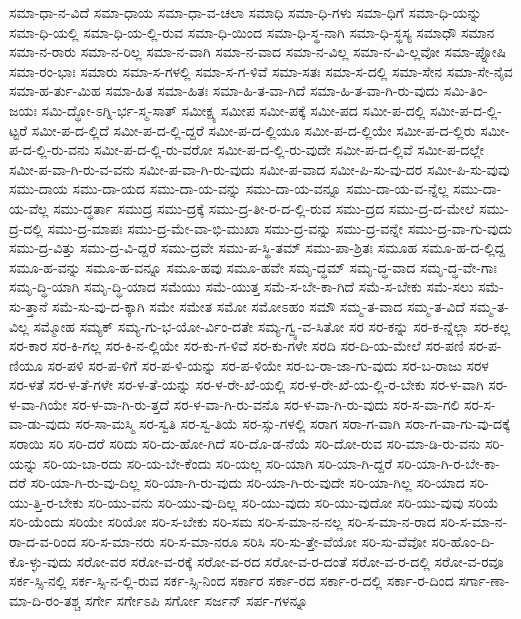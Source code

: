 {ಸಮಾ-ಧಾ-ನ-ವಿದೆ
ಸಮಾ-ಧಾಯ
ಸಮಾ-ಧಾ-ವ-ಚಲಾ
ಸಮಾಧಿ
ಸಮಾ-ಧಿ-ಗಳು
ಸಮಾ-ಧಿಗೆ
ಸಮಾ-ಧಿ-ಯನ್ನು
ಸಮಾ-ಧಿ-ಯಲ್ಲಿ
ಸಮಾ-ಧಿ-ಯ-ಲ್ಲಿ-ರುವ
ಸಮಾ-ಧಿ-ಯಿಂದ
ಸಮಾ-ಧಿ-ಸ್ಥ-ನಾಗಿ
ಸಮಾ-ಧಿ-ಸ್ಥಸ್ಯ
ಸಮಾಧೌ
ಸಮಾನ
ಸಮಾ-ನ-ರಾರು
ಸಮಾ-ನ-ರಿಲ್ಲ
ಸಮಾ-ನ-ವಾಗಿ
ಸಮಾ-ನ-ವಾದ
ಸಮಾ-ನ-ವಿಲ್ಲ
ಸಮಾ-ನ-ವಿ-ಲ್ಲವೋ
ಸಮಾ-ಪ್ನೋಷಿ
ಸಮಾ-ರಂ-ಭಾಃ
ಸಮಾರು
ಸಮಾ-ಸ-ಗಳಲ್ಲಿ
ಸಮಾ-ಸ-ಗ-ಳಿವೆ
ಸಮಾ-ಸತಃ
ಸಮಾ-ಸ-ದಲ್ಲಿ
ಸಮಾ-ಸೇನ
ಸಮಾ-ಸೇ-ನೈವ
ಸಮಾ-ಹ-ರ್ತು-ಮಿಹ
ಸಮಾ-ಹಿತ
ಸಮಾ-ಹಿತಃ
ಸಮಾ-ಹಿ-ತ-ವಾ-ಗಿದೆ
ಸಮಾ-ಹಿ-ತ-ವಾ-ಗಿ-ರು-ವುದು
ಸಮಿ-ತಿಂ-ಜಯಃ
ಸಮಿ-ದ್ಧೋ-ಽಗ್ನಿ-ರ್ಭ-ಸ್ಮ-ಸಾತ್
ಸಮೀಕ್ಷ್ಯ
ಸಮೀಪ
ಸಮೀ-ಪಕ್ಕೆ
ಸಮೀ-ಪದ
ಸಮೀ-ಪ-ದಲ್ಲಿ
ಸಮೀ-ಪ-ದ-ಲ್ಲಿ-ಟ್ಟರೆ
ಸಮೀ-ಪ-ದ-ಲ್ಲಿದೆ
ಸಮೀ-ಪ-ದ-ಲ್ಲಿ-ದ್ದರೆ
ಸಮೀ-ಪ-ದ-ಲ್ಲಿಯೂ
ಸಮೀ-ಪ-ದ-ಲ್ಲಿಯೇ
ಸಮೀ-ಪ-ದ-ಲ್ಲಿರು
ಸಮೀ-ಪ-ದ-ಲ್ಲಿ-ರು-ವನು
ಸಮೀ-ಪ-ದ-ಲ್ಲಿ-ರು-ವರೋ
ಸಮೀ-ಪ-ದ-ಲ್ಲಿ-ರು-ವುದೇ
ಸಮೀ-ಪ-ದ-ಲ್ಲಿವೆ
ಸಮೀ-ಪ-ದಲ್ಲೇ
ಸಮೀ-ಪ-ವಾ-ಗಿ-ರು-ವ-ವನು
ಸಮೀ-ಪ-ವಾ-ಗಿ-ರು-ವುದು
ಸಮೀ-ಪ-ವಾದ
ಸಮೀ-ಪಿ-ಸು-ವು-ದರ
ಸಮೀ-ಪಿ-ಸು-ವುವು
ಸಮು-ದಾಯ
ಸಮು-ದಾ-ಯದ
ಸಮು-ದಾ-ಯ-ವನ್ನು
ಸಮು-ದಾ-ಯ-ವನ್ನೂ
ಸಮು-ದಾ-ಯ-ವ-ನ್ನೆಲ್ಲ
ಸಮು-ದಾ-ಯ-ವೆಲ್ಲ
ಸಮು-ದ್ಧರ್ತಾ
ಸಮುದ್ರ
ಸಮು-ದ್ರಕ್ಕೆ
ಸಮು-ದ್ರ-ತೀ-ರ-ದ-ಲ್ಲಿ-ರುವ
ಸಮು-ದ್ರದ
ಸಮು-ದ್ರ-ದ-ಮೇಲೆ
ಸಮು-ದ್ರ-ದಲ್ಲಿ
ಸಮು-ದ್ರ-ಮಾಪಃ
ಸಮು-ದ್ರ-ಮೇ-ವಾ-ಭಿ-ಮುಖಾ
ಸಮು-ದ್ರ-ವನ್ನು
ಸಮು-ದ್ರ-ವನ್ನೇ
ಸಮು-ದ್ರ-ವಾ-ಗು-ವುದು
ಸಮು-ದ್ರ-ವಿತ್ತು
ಸಮು-ದ್ರ-ವಿ-ದ್ದರೆ
ಸಮು-ದ್ರವೇ
ಸಮು-ಪ-ಸ್ಥಿ-ತಮ್
ಸಮು-ಪಾ-ಶ್ರಿತಃ
ಸಮೂಹ
ಸಮೂ-ಹ-ದ-ಲ್ಲಿದ್ದ
ಸಮೂ-ಹ-ವನ್ನು
ಸಮೂ-ಹ-ವನ್ನೂ
ಸಮೂ-ಹವು
ಸಮೂ-ಹವೇ
ಸಮೃ-ದ್ಧಮ್
ಸಮೃ-ದ್ಧ-ವಾದ
ಸಮೃ-ದ್ಧ-ವೇ-ಗಾಃ
ಸಮೃ-ದ್ಧಿ-ಯಾಗಿ
ಸಮೃ-ದ್ಧಿ-ಯಾದ
ಸಮೆಯು
ಸಮೆ-ಯುತ್ತ
ಸಮೆ-ಸ-ಬೇ-ಕಾ-ಗಿದೆ
ಸಮೆ-ಸ-ಬೇಕು
ಸಮೆ-ಸಲು
ಸಮೆ-ಸು-ತ್ತಾನೆ
ಸಮೆ-ಸು-ವು-ದ-ಕ್ಕಾಗಿ
ಸಮೇ
ಸಮೇತ
ಸಮೋ
ಸಮೋಽಹಂ
ಸಮೌ
ಸಮ್ಮ-ತ-ವಾದ
ಸಮ್ಮ-ತ-ವಿದೆ
ಸಮ್ಮ-ತ-ವಿಲ್ಲ
ಸಮ್ಮೋಹ
ಸಮ್ಯಕ್
ಸಮ್ಯ-ಗು-ಭ-ಯೋ-ರ್ವಿಂ-ದತೇ
ಸಮ್ಯ-ಗ್ವ್ಯ-ವ-ಸಿತೋ
ಸರ
ಸರ-ಕನ್ನು
ಸರ-ಕ-ನ್ನೆಲ್ಲಾ
ಸರ-ಕಲ್ಲ
ಸರ-ಕಾರ
ಸರ-ಕಿ-ಗಲ್ಲ
ಸರ-ಕಿ-ನ-ಲ್ಲಿಯೇ
ಸರ-ಕು-ಗ-ಳಿವೆ
ಸರ-ಕು-ಗಳೇ
ಸರದಿ
ಸರ-ದಿ-ಯ-ಮೇಲೆ
ಸರ-ಪಣಿ
ಸರ-ಪ-ಣಿಯೂ
ಸರ-ಪಳಿ
ಸರ-ಪ-ಳಿಗೆ
ಸರ-ಪ-ಳಿ-ಯನ್ನು
ಸರ-ಪ-ಳಿಯೇ
ಸರ-ಬ-ರಾ-ಜಾ-ಗು-ವುದು
ಸರ-ಬ-ರಾಜು
ಸರಳ
ಸರ-ಳತೆ
ಸರ-ಳ-ತೆ-ಗಳೇ
ಸರ-ಳ-ತೆ-ಯನ್ನು
ಸರ-ಳ-ರೇ-ಖೆ-ಯಲ್ಲಿ
ಸರ-ಳ-ರೇ-ಖೆ-ಯ-ಲ್ಲಿ-ರ-ಬೇಕು
ಸರ-ಳ-ವಾಗಿ
ಸರ-ಳ-ವಾ-ಗಿಯೇ
ಸರ-ಳ-ವಾ-ಗಿ-ರು-ತ್ತದೆ
ಸರ-ಳ-ವಾ-ಗಿ-ರು-ವನೊ
ಸರ-ಳ-ವಾ-ಗಿ-ರು-ವುದು
ಸರ-ಸ-ವಾ-ಗಲಿ
ಸರ-ಸ-ವಾ-ಡು-ವುದು
ಸರ-ಸಾ-ಮಸ್ಮಿ
ಸರ-ಸ್ವತಿ
ಸರ-ಸ್ವ-ತಿಯೆ
ಸರ-ಸ್ಸು-ಗಳಲ್ಲಿ
ಸರಾಗ
ಸರಾ-ಗ-ವಾಗಿ
ಸರಾ-ಗ-ವಾ-ಗು-ವು-ದಕ್ಕೆ
ಸರಾಯಿ
ಸರಿ
ಸರಿ-ದರೆ
ಸರಿದು
ಸರಿ-ದು-ಹೋ-ಗಿದೆ
ಸರಿ-ದೊ-ಡ-ನೆಯೆ
ಸರಿ-ದೋ-ರುವ
ಸರಿ-ಮಾ-ಡಿ-ರು-ವನು
ಸರಿ-ಯನ್ನು
ಸರಿ-ಯ-ಬಾ-ರದು
ಸರಿ-ಯ-ಬೇ-ಕೆಂದು
ಸರಿ-ಯಲ್ಲ
ಸರಿ-ಯಾಗಿ
ಸರಿ-ಯಾ-ಗಿ-ದ್ದರೆ
ಸರಿ-ಯಾ-ಗಿ-ರ-ಬೇ-ಕಾ-ದರೆ
ಸರಿ-ಯಾ-ಗಿ-ರು-ವು-ದಿಲ್ಲ
ಸರಿ-ಯಾ-ಗಿ-ರು-ವುದು
ಸರಿ-ಯಾ-ಗಿ-ರು-ವುದೇ
ಸರಿ-ಯಾ-ಗಿಲ್ಲ
ಸರಿ-ಯಾದ
ಸರಿ-ಯು-ತ್ತಿ-ರ-ಬೇಕು
ಸರಿ-ಯು-ವನು
ಸರಿ-ಯು-ವು-ದಿಲ್ಲ
ಸರಿ-ಯು-ವುದು
ಸರಿ-ಯು-ವುದೋ
ಸರಿ-ಯು-ವುವು
ಸರಿಯೆ
ಸರಿ-ಯೆಂದು
ಸರಿಯೇ
ಸರಿಯೋ
ಸರಿ-ಸ-ಬೇಕು
ಸರಿ-ಸಮ
ಸರಿ-ಸ-ಮಾ-ನ-ನಲ್ಲ
ಸರಿ-ಸ-ಮಾ-ನ-ರಾದ
ಸರಿ-ಸ-ಮಾ-ನ-ರಾ-ದ-ವ-ರಿಂದ
ಸರಿ-ಸ-ಮಾ-ನರು
ಸರಿ-ಸ-ಮಾ-ನರೂ
ಸರಿಸಿ
ಸರಿ-ಸು-ತ್ತೇ-ವೆಯೋ
ಸರಿ-ಸು-ವೆವೋ
ಸರಿ-ಹೊಂ-ದಿ-ಕೊ-ಳ್ಳು-ವುದು
ಸರೋ-ವರ
ಸರೋ-ವ-ರಕ್ಕೆ
ಸರೋ-ವ-ರದ
ಸರೋ-ವ-ರ-ದಂತೆ
ಸರೋ-ವ-ರ-ದಲ್ಲಿ
ಸರೋ-ವ-ರವೂ
ಸರ್ಕ-ಸ್ಸಿ-ನಲ್ಲಿ
ಸರ್ಕ-ಸ್ಸಿ-ನ-ಲ್ಲಿ-ರುವ
ಸರ್ಕ-ಸ್ಸಿ-ನಿಂದ
ಸರ್ಕಾರ
ಸರ್ಕಾ-ರದ
ಸರ್ಕಾ-ರ-ದಲ್ಲಿ
ಸರ್ಕಾ-ರ-ದಿಂದ
ಸರ್ಗಾ-ಣಾ-ಮಾ-ದಿ-ರಂ-ತಶ್ಚ
ಸರ್ಗೇ
ಸರ್ಗೇಽಪಿ
ಸರ್ಗೋ
ಸರ್ಜನ್
ಸರ್ಪ-ಗಳನ್ನೂ
}
